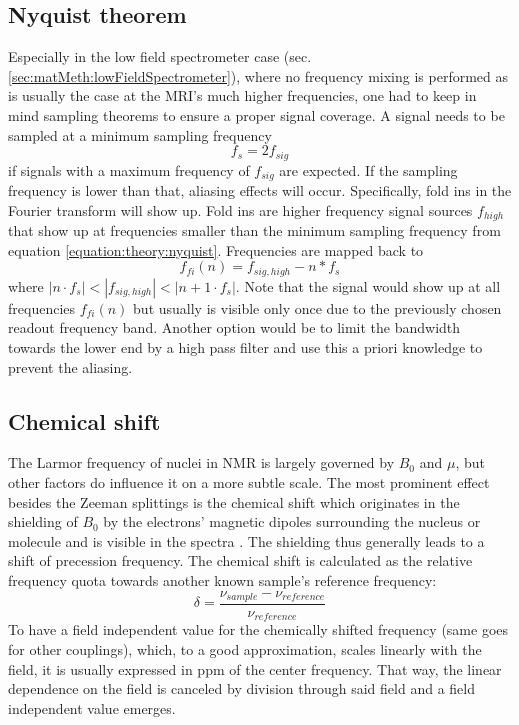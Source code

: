         \subsection{Nyquist theorem}
        Especially in the low field spectrometer case (sec. \ref{sec:matMeth:lowFieldSpectrometer}), where no frequency mixing is performed as is usually the case at the MRI's much higher frequencies, one had to keep in mind sampling theorems to ensure a proper signal coverage. A signal needs to be sampled at a minimum sampling frequency \cite{shannon_mathematical_1948}
                \begin{equation}
                    \label{equation:theory:nyquist}
                    f_{s} = 2 f_{sig}
                \end{equation}
                if signals with a maximum frequency of $f_{sig}$ are expected. If the sampling frequency is lower than that, aliasing effects will occur. Specifically, fold ins in the Fourier transform will show up. Fold ins are higher frequency signal sources $f_{high}$ that show up at frequencies smaller than the minimum sampling frequency from equation \ref{equation:theory:nyquist}. Frequencies are mapped back to
                \begin{equation}
                    f_{fi}(n) = f_{sig,high} - n * f_s
                \end{equation}
                where $|n\cdot f_s| < |f_{sig,high}| < |n+1 \cdot f_s|$. Note that the signal would show up at all frequencies $f_{fi}(n)$ but usually is visible only once due to the previously chosen readout frequency band.
                Another option would be to limit the bandwidth towards the lower end by a high pass filter and use this a priori knowledge to prevent the aliasing.
        \subsection{Chemical shift}
            The Larmor frequency of nuclei in NMR is largely governed by $B_0$ and $\mu$, but other factors do influence it on a more subtle scale. The most prominent effect besides the Zeeman splittings is the chemical shift which originates in the shielding of $B_0$ by the electrons' magnetic dipoles surrounding the nucleus or molecule and is visible in the spectra \cite{gottlieb_nmr_1997}. The shielding thus generally leads to a shift of precession frequency. The chemical shift is calculated as the relative frequency quota towards another known sample's reference frequency:
            \begin{equation}
                \delta = \frac{\nu_{sample} - \nu_{reference}}{\nu_{reference}}
            \end{equation}
            To have a field independent value for the chemically shifted frequency (same goes for other couplings), which, to a good approximation, scales linearly with the field, it is usually expressed in ppm of the center frequency. That way, the linear dependence on the field is canceled by division through said field and a field independent value emerges.
